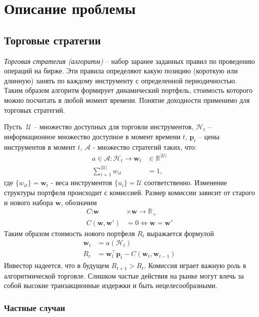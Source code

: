 \chapter{Описание проблемы}
\section{Торговые стратегии}
\textit{Торговая стратегия (алгоритм)} -- набор заранее заданных правил по проведению операций на бирже. 
Эти правила определяют какую позицию (короткую или длинную) занять по каждому инструменту с определенной периодичностью. Таким образом алгоритм формирует динамический портфель, стоимость которого можно посчитать в любой момент времени. Понятие доходности применимо для торговых стратегий.

Пусть $\;\mathcal{U}$ -- множество доступных для торговли инструментов, $\mathcal{H}_t$ -- информационное множество доступное в момент времени $t$, $\textbf{p}_t$ -- цены инструментов в момент $t$,  $\mathcal{A}$ - множество стратегий таких, что:
\begin{align}
	a \in \mathcal{A} \colon \mathcal{H}_t \rightarrow \textbf{w}_t &\in \mathbb{R}^{|\mathcal{U}|}\\ 
	\sum_{i=1}^{|\mathcal{U}|} w_{it} &= 1,
\end{align}
где $\{w_{it}\} = \textbf{w}_t$ - веса инструментов $\{u_i\} = \mathcal{U}$ соответственно. 
Изменение структуры портфеля происходит с комиссией. 
Размер комиссии зависит от старого и нового набора $\textbf{w}$, обозначим
\begin{align}
	\textit{C} \colon \textbf{w} &\times \textbf{w} \rightarrow \mathbb{R}_+\\
	\textit{C}(\textbf{w}, \textbf{w}') &= 0 \iff \textbf{w} = \textbf{w}'	
\end{align}
Таким образом стоимость нового портфеля $R_t$ выражается формулой
\begin{align}
	\textbf{w}_{t} &= a(\mathcal{H}_t)\\
	R_t &= \textbf{w}_{t}^\top\textbf{p}_t - \textit{C}(\textbf{w}_{t}, \textbf{w}_{t-1})
\end{align}
Инвестор надеется, что в будущем $R_{t+1} > R_t$. 
Комиссия играет важную роль в алгоритмической торговле. 
Слишком частые действия на рынке могут влечь за собой высокие транзакционные издержки и быть нецелесообразными.
\subsection{Частные случаи}
